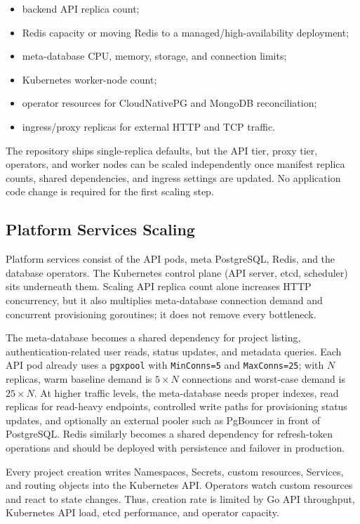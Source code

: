\begin{itemize}
    \item backend API replica count;
    \item Redis capacity or moving Redis to a managed/high-availability deployment;
    \item meta-database CPU, memory, storage, and connection limits;
    \item Kubernetes worker-node count;
    \item operator resources for CloudNativePG and MongoDB reconciliation;
    \item ingress/proxy replicas for external HTTP and TCP traffic.
\end{itemize}

The repository ships single-replica defaults, but the API tier, proxy tier, operators, and worker nodes can be scaled independently once manifest replica counts, shared dependencies, and ingress settings are updated. No application code change is required for the first scaling step.

\subsection{Platform Services Scaling}

Platform services consist of the API pods, meta PostgreSQL, Redis, and the database operators. The Kubernetes control plane (API server, etcd, scheduler) sits underneath them. Scaling API replica count alone increases HTTP concurrency, but it also multiplies meta-database connection demand and concurrent provisioning goroutines; it does not remove every bottleneck.

The meta-database becomes a shared dependency for project listing, authentication-related user reads, status updates, and metadata queries. Each API pod already uses a \texttt{pgxpool} with \texttt{MinConns=5} and \texttt{MaxConns=25}; with $N$ replicas, warm baseline demand is $5 \times N$ connections and worst-case demand is $25 \times N$. At higher traffic levels, the meta-database needs proper indexes, read replicas for read-heavy endpoints, controlled write paths for provisioning status updates, and optionally an external pooler such as PgBouncer in front of PostgreSQL. Redis similarly becomes a shared dependency for refresh-token operations and should be deployed with persistence and failover in production.

Every project creation writes Namespaces, Secrets, custom resources, Services, and routing objects into the Kubernetes API. Operators watch custom resources and react to state changes. Thus, creation rate is limited by Go API throughput, Kubernetes API load, etcd performance, and operator capacity.

